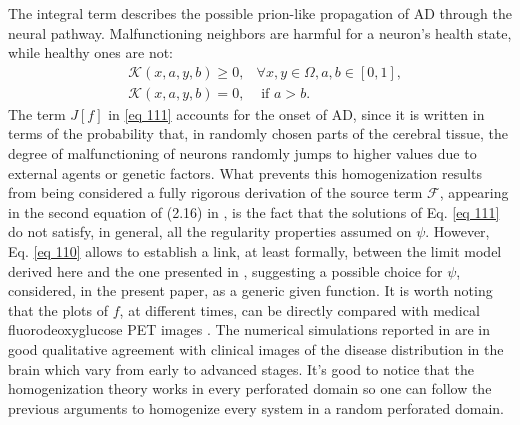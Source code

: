 The integral term describes the possible prion-like propagation of AD through the neural pathway. Malfunctioning neighbors are harmful for a neuron's health state, while healthy ones are not:
\begin{align*}
&\mathcal{K}(x, a, y, b) \geq 0, & \forall x, y \in \Omega, a, b \in[0,1], \\
&\mathcal{K}(x, a, y, b)=0, & \text { if } a>b .
\end{align*}
The term $J[f]$ in \eqref{eq 111} accounts for the onset of AD, since it is written in terms of the probability that, in randomly chosen parts of the cerebral tissue, the degree of malfunctioning of neurons randomly jumps to higher values due to external agents or genetic factors. What prevents this homogenization results from being considered a fully rigorous derivation of the source term $\mathcal{F}$, appearing in the second equation of (2.16) in \cite{Bertsch}, is the fact that the solutions of Eq. \eqref{eq 111} do not satisfy, in general, all the regularity properties assumed on $\psi$. However, Eq. \eqref{eq 110} allows to establish a link, at least formally, between the limit model derived here and the one presented in \cite{Bertsch}, suggesting a possible choice for $\psi$, considered, in the present paper, as a generic given function.
It is worth noting that the plots of $f$, at different times, can be directly compared with medical fluorodeoxyglucose PET images \cite{Bertsch}. The numerical simulations reported in \cite{Bertsch} are in good qualitative agreement with clinical images of the disease distribution in the brain which vary from early to advanced stages.
It's good to notice that the homogenization theory works in every perforated domain so one can follow the previous arguments to homogenize every system in a random perforated domain.